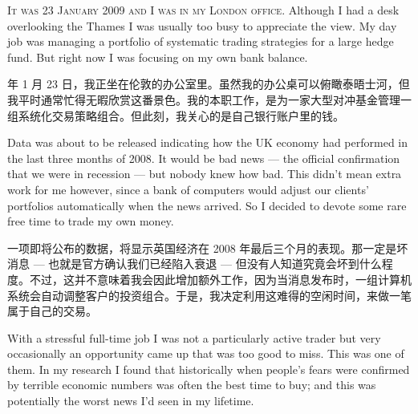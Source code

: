 

\begin{englishblock} \noindent\textsc{It was 23 January 2009 and I was in my London office.} Although I had a desk overlooking the Thames I was usually too busy to appreciate the view. My day job was managing a portfolio of systematic trading strategies for a large hedge fund. But right now I was focusing on my own bank balance. \end{englishblock}

\begin{chineseblock}  年 1 月 23 日，我正坐在伦敦的办公室里。虽然我的办公桌可以俯瞰泰晤士河，但我平时通常忙得无暇欣赏这番景色。我的本职工作，是为一家大型对冲基金管理一组系统化交易策略组合。但此刻，我关心的是自己银行账户里的钱。\end{chineseblock}

\bipairgap

\begin{englishblock} Data was about to be released indicating how the UK economy had performed in the last three months of 2008. It would be bad news --- the official confirmation that we were in recession --- but nobody knew how bad. This didn't mean extra work for me however, since a bank of computers would adjust our clients' portfolios automatically when the news arrived. So I decided to devote some rare free time to trade my own money. \end{englishblock}

\begin{chineseblock}一项即将公布的数据，将显示英国经济在 2008 年最后三个月的表现。那一定是坏消息 --- 也就是官方确认我们已经陷入衰退 --- 但没有人知道究竟会坏到什么程度。不过，这并不意味着我会因此增加额外工作，因为当消息发布时，一组计算机系统会自动调整客户的投资组合。于是，我决定利用这难得的空闲时间，来做一笔属于自己的交易。\end{chineseblock}

\bipairgap

\begin{englishblock} With a stressful full-time job I was not a particularly active trader but very occasionally an opportunity came up that was too good to miss. This was one of them. In my research I found that historically when people's fears were confirmed by terrible economic numbers was often the best time to buy; and this was potentially the worst news I'd seen in my lifetime. \end{englishblock}

